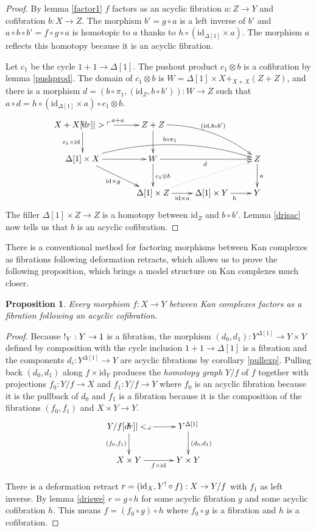 \documentclass{amsart}
\theoremstyle{plain}
\newtheorem{prop}[theorem]{Proposition}
\theoremstyle{definition}
\newcommand\id{\mathrm{id}}
\begin{document}
\begin{proof} By lemma \ref{factor1} $f$ factors as an acyclic fibration $a:Z\to Y$ and cofibration $b:X\to Z$. The morphism $b' = g\circ a$ is a left inverse of $b'$ and $a\circ b\circ b' = f\circ g\circ a$ is homotopic to $a$ thanks to $h\circ(\id_{\Delta[1]}\times a)$. The morphism $a$ reflects this homotopy because it is an acyclic fibration.

Let $c_1$ be the cycle $1+1\to \Delta[1]$. The pushout product $c_1\otimes b$ is a cofibration by lemma \ref{pushprod}. The domain of $c_1\otimes b$ is $W=\Delta[1]\times X +_{X+X} (Z+Z)$, and there is a morphism $d=(b\circ\pi_1,(\id_Z,b\circ b')):W\to Z$ such that $a\circ d = h\circ (\id_{\Delta[1]}\times a)\circ c_1\otimes b$.
\[\xymatrix{
X+X\ar[r]^{a+a} \ar[d]_{c_1\times \id} \po & Z+Z\ar[d] \ar@/^3ex/[drr]^{(\id,b\circ b')} \\
\Delta[1]\times X \ar[r]\ar[dr]_{\id\times g}\ar@/^4ex/[rrr]^{b\circ\pi_1} & W \ar[rr]_d \ar[d]^{c_1\otimes b} && Z\ar[d]^a \\
& \Delta[1]\times Z \ar[r]_{\id\times a} \ar@{.>}[urr] & \Delta[1]\times Y \ar[r]_h & Y
}\]
The filler $\Delta[1]\times Z\to Z$ is a homotopy between $\id_Z$ and $b\circ b'$. Lemma \ref{drisac} now tells us that $b$ is an acyclic cofibration.
\end{proof}

There is a conventional method for factoring morphisms between Kan complexes as fibrations following deformation retracts, which allows us to prove the following proposition, which brings a model structure on Kan complexes much closer.

\begin{prop} Every morphism $f:X\to Y$ between Kan complexes factors as a fibration following an acyclic cofibration. \label{factor2} \end{prop}

\begin{proof} Because $!_Y:Y\to 1$ is a fibration, the morphism $(d_0,d_1):Y^{\Delta[1]} \to Y\times Y$ defined by composition with the cycle inclusion $1+1\to \Delta[1]$ is a fibration and the components $d_i:Y^{\Delta[1]}\to Y$ are acyclic fibrations by corollary \ref{pullexp}. Pulling back $(d_0,d_1)$ along $f\times \id_Y$ produces the \emph{homotopy graph} $Y/f$ of $f$ together with projections $f_0:Y/f\to X$ and $f_1:Y/f\to Y$ where $f_0$ is an acyclic fibration because it is the pullback of $d_0$ and $f_1$ is a fibration because it is the composition of the fibrations $(f_0,f_1)$ and $X\times Y\to Y$.
\[\xymatrix{
Y/f \ar[r]\ar[d]_{(f_0,f_1)} \pb & Y^{\Delta[1]} \ar[d]^{(d_0,d_1)} \\
X\times Y \ar[r]_{f\times\id} & Y\times Y
}\]

There is a deformation retract $r=(\id_X,Y^\bang\circ f):X\to Y/f$ with $f_1$ as left inverse. By lemma \ref{driswe} $r = g\circ h$ for some acyclic fibration $g$ and some acyclic cofibration $h$. This means $f = (f_0\circ g)\circ h$ where $f_0\circ g$ is a fibration and $h$ is a cofibration.
\end{proof}
\end{document}
